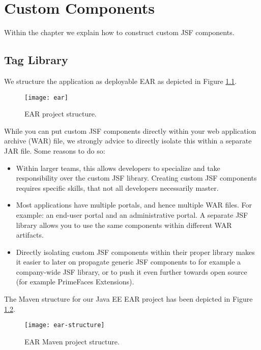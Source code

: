 %

\chapter{Custom Components}
Within the chapter we explain how to construct custom JSF components.

\section{Tag Library}

We structure the application as deployable EAR as depicted in Figure \ref{fig:ear}.
\begin{figure}[htbp]
	\begin{center}
		\texttt{[image: ear]}
		\caption{EAR project structure.}
		\label{fig:ear}
	\end{center}
\end{figure}
While you can put custom JSF components directly within your web application archive (WAR) file,
we strongly advice to directly isolate this within a separate JAR file.
Some reasons to do so:
\begin{itemize}
	\item Within larger teams, this allows developers to specialize and take responsibility over the custom JSF library.
	Creating custom JSF components requires specific skills, that not all developers necessarily master.
	\item Most applications have multiple portals, and hence multiple WAR files. For example: an end-user portal and an administrative portal. A separate JSF library allows you to use the same components within different WAR artifacts.
	\item Directly isolating custom JSF components within their proper library makes it easier to later on propagate generic JSF components to for example a company-wide JSF library, or to push it even further towards open source (for example PrimeFaces Extensions).
\end{itemize}
The Maven structure for our Java EE EAR project has been depicted in Figure \ref{fig:ear-structure}.
\begin{figure}[htbp]
	\begin{center}
		\texttt{[image: ear-structure]}
		\caption{EAR Maven project structure.}
		\label{fig:ear-structure}
	\end{center}
\end{figure}

